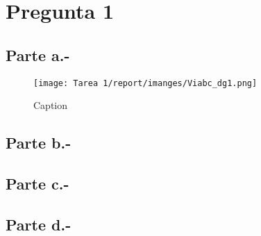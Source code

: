 %
%


\newcommand{\explorelite}{\textit{explore\_lite}}
\newcommand{\movebase}{\textit{move\_base}}

\section{Pregunta 1}

\subsection{Parte a.-}

\begin{figure}
    \centering
    \texttt{[image: Tarea 1/report/imanges/Viabc\_dg1.png]}
    \caption{Caption}
    \label{fig:enter-label}
\end{figure}

\subsection{Parte b.-}



\subsection{Parte c.-}



\subsection{Parte d.-}



